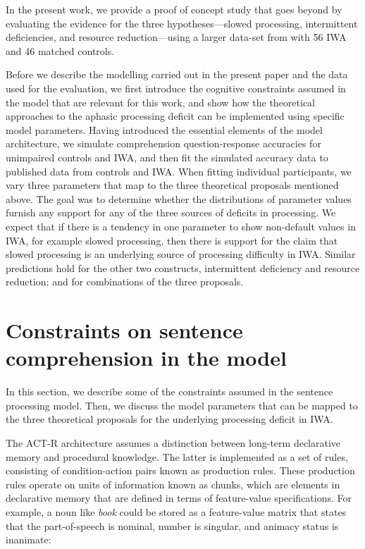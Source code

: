 \documentclass[10pt,letterpaper]{article}
\begin{document}
In the present work, we provide a proof of concept study that goes beyond  by evaluating the evidence for the three hypotheses---slowed processing, intermittent deficiencies, and resource reduction---using a larger data-set from  with 56 IWA and 46 matched controls.

Before we describe the modelling carried out in the present paper and the data used for the evaluation, 
we first introduce the cognitive constraints assumed in the  model that are relevant for this work, and show how the theoretical approaches to the aphasic processing deficit can be implemented using specific model parameters. 
Having introduced the essential elements of the model architecture, 
we simulate comprehension question-response accuracies for unimpaired controls and IWA, and then fit the simulated accuracy data to published data
\cite{CaplanEtAl2015} from controls and IWA. When fitting individual participants, we vary three parameters that map to the three theoretical proposals mentioned above. The goal was to determine whether the distributions of parameter values furnish any support for any of the three sources of deficits in processing. 
We expect that if there is a tendency in one parameter to show non-default values in IWA, for example slowed processing,
then there is support for the claim that slowed processing is an underlying source of processing difficulty in IWA. Similar predictions hold for the other two constructs, intermittent deficiency and resource reduction; and for combinations of the three proposals.

\section{Constraints on sentence comprehension in the \protect{} model}

In this section, we describe some of the constraints assumed in the  sentence processing model. Then, we discuss the model parameters that can be mapped to the three theoretical proposals for the underlying processing deficit in IWA.

The ACT-R architecture assumes a distinction between long-term declarative memory and procedural knowledge. The latter is implemented as a set of rules, consisting of condition-action pairs known as production rules. These production rules operate on units of information known as chunks, which are elements in declarative memory that are defined in terms of feature-value specifications. For example, a noun like \textit{book} could be stored as a feature-value matrix that states that the part-of-speech is nominal, number is singular, and animacy status is inanimate:
\end{document}

